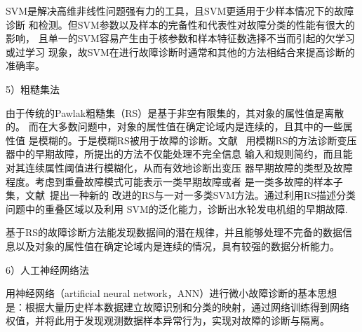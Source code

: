 SVM是解决高维非线性问题强有力的工具，且SVM更适用于少样本情况下的故障诊断
和检测。但SVM参数以及样本的完备性和代表性对故障分类的性能有很大的影响，
且单一的SVM容易产生由于核参数和样本特征数选择不当而引起的欠学习或过学习
现象，故SVM在进行故障诊断时通常和其他的方法相结合来提高诊断的准确率。

5）粗糙集法

由于传统的Pawlak粗糙集（RS）是基于非空有限集的，其对象的属性值是离散的。
而在大多数问题中，对象的属性值在确定论域内是连续的，且其中的一些属性值
是模糊的。于是模糊RS被用于故障的诊断。文献~
用模糊RS的方法诊断变压器中的早期故障，所提出的方法不仅能处理不完全信息
输入和规则简约，而且能对其连续属性阈值进行模糊化，从而有效地诊断出变压
器早期故障的类型及故障程度。考虑到重叠故障模式可能表示一类早期故障或者
是一类多故障的样本子集，文献~提出一种新的
改进的RS与一对一多类SVM方法。通过利用RS描述分类问题中的重叠区域以及利用
SVM的泛化能力，诊断出水轮发电机组的早期故障.

基于RS的故障诊断方法能发现数据间的潜在规律，并且能够处理不完备的数据信
息以及对象的属性值在确定论域内是连续的情况，具有较强的数据分析能力。

6）人工神经网络法

用神经网络（artificial neural network，ANN）进行微小故障诊断的基本思想
是：根据大量历史样本数据建立故障识别和分类的映射，通过网络训练得到网络
权值，并将此用于发现观测数据样本异常行为，实现对故障的诊断与隔离。

